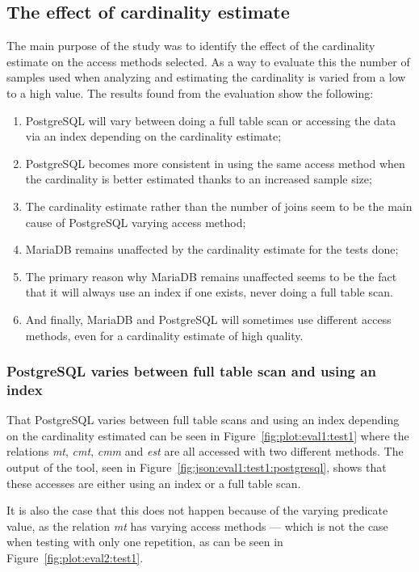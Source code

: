 \subsection{The effect of cardinality estimate}
The main purpose of the study was to identify the effect of the cardinality
estimate on the access methods selected. As a way to evaluate this the number of
samples used when analyzing and estimating the cardinality is varied from a low
to a high value. The results found from the evaluation show the following:
\begin{enumerate}
\item PostgreSQL will vary between doing a full table scan or accessing the data
  via an index depending on the cardinality estimate;
\item PostgreSQL becomes more consistent in using the same access method when
  the cardinality is better estimated thanks to an increased sample size;
\item The cardinality estimate rather than the number of joins seem to be the
  main cause of PostgreSQL varying access method;
\item MariaDB remains unaffected by the cardinality estimate for the tests done;
\item The primary reason why MariaDB remains unaffected seems to be the fact
  that it will always use an index if one exists, never doing a full table scan.
\item And finally, MariaDB and PostgreSQL will sometimes use different access
  methods, even for a cardinality estimate of high quality.
\end{enumerate}

\subsubsection{PostgreSQL varies between full table scan and using an index}
That PostgreSQL varies between full table scans and using an index depending on
the cardinality estimated can be seen in Figure~\ref{fig:plot:eval1:test1} where
the relations \textit{mt}, \textit{cmt}, \textit{cmm} and \textit{est} are all
accessed with two different methods. The output of the tool, seen in
Figure~\ref{fig:json:eval1:test1:postgresql}, shows that these accesses are
either using an index or a full table scan.

It is also the case that this does not happen because of the varying predicate
value, as the relation \textit{mt} has varying access methods --- which is not
the case when testing with only one repetition, as can be seen in
Figure~\ref{fig:plot:eval2:test1}.

